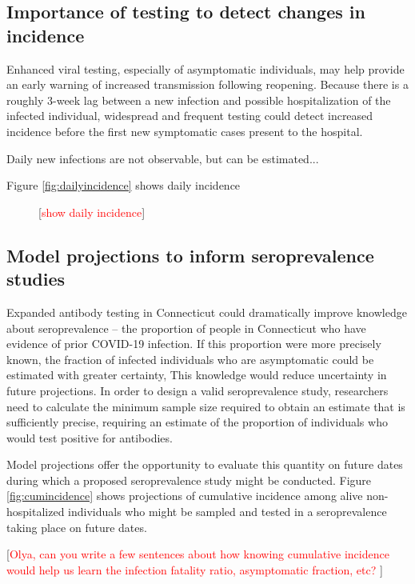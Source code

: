 \documentclass[11pt]{article}
\newcommand{\comment}[1]{[\textcolor{red}{#1}]}
\begin{document}
\subsection*{Importance of testing to detect changes in incidence}

Enhanced viral testing, especially of asymptomatic individuals, may help provide an early warning of increased transmission following reopening.  Because there is a roughly 3-week lag between a new infection and possible hospitalization of the infected individual, widespread and frequent testing could detect increased incidence before the first new symptomatic cases present to the hospital.  

Daily new infections are not observable, but can be estimated...

Figure \ref{fig:dailyincidence} shows daily incidence 




\begin{figure}
\centering
\caption{\comment{show daily incidence}}
\label{fig:dailyncidence}
\end{figure}




\subsection*{Model projections to inform seroprevalence studies}

Expanded antibody testing in Connecticut could dramatically improve knowledge about seroprevalence -- the proportion of people in Connecticut who have evidence of prior COVID-19 infection. If this proportion were more precisely known, the fraction of infected individuals who are asymptomatic could be estimated with greater certainty,   This knowledge would reduce uncertainty in future projections.  In order to design a valid seroprevalence study, researchers need to calculate the minimum sample size required to obtain an estimate that is sufficiently precise, requiring an estimate of the proportion of individuals who would test positive for antibodies. 


Model projections offer the opportunity to evaluate this quantity on future dates during which a proposed seroprevalence study might be conducted.  Figure \ref{fig:cumincidence} shows projections of cumulative incidence among alive non-hospitalized individuals who might be sampled and tested in a seroprevalence taking place on future dates.  

\comment{Olya, can you write a few sentences about how knowing cumulative incidence would help us learn the infection fatality ratio, asymptomatic fraction, etc? }
\end{document}
